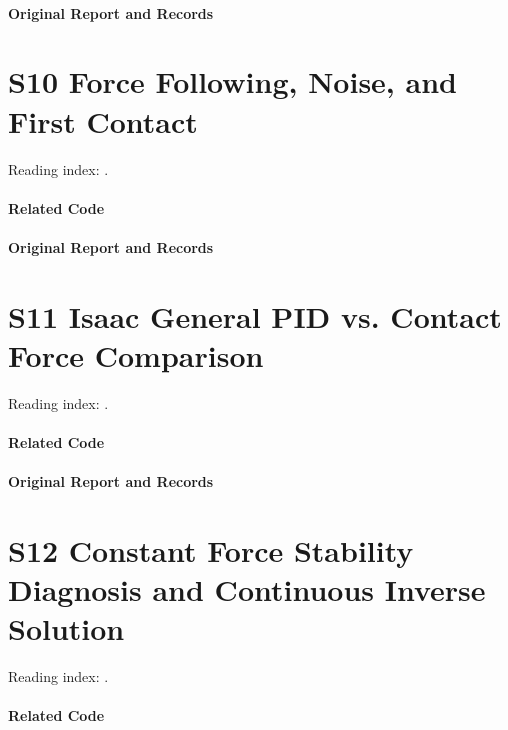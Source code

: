 \paragraph{Original Report and Records}
\noindent{}\par
\section*{S10 Force Following, Noise, and First Contact}
\hypertarget{code-s10}{}
Reading index: .
\paragraph{Related Code}
\noindent{}\par
\paragraph{Original Report and Records}
\noindent{}\par
\section*{S11 Isaac General PID vs. Contact Force Comparison}
\hypertarget{code-s11}{}
Reading index: .
\paragraph{Related Code}
\noindent{}\par
\paragraph{Original Report and Records}
\noindent{}\par
\section*{S12 Constant Force Stability Diagnosis and Continuous Inverse Solution}
\hypertarget{code-s12}{}
Reading index: .
\paragraph{Related Code}
\noindent{}\par
